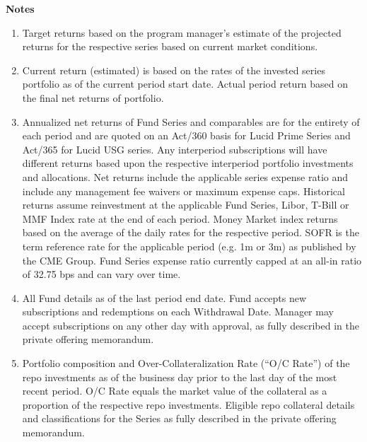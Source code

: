 \documentclass[9pt]{article}
\begin{document}
    \onecolumn



    \pagebreak

    \footnotesize
    \noindent\textbf{\color{lucid_blue}Notes}

    \begin{enumerate}
        \item Target returns based on the program manager's estimate of the projected returns for the respective series based on current market conditions.

        \item Current return (estimated) is based on the rates of the invested series portfolio as of the current period start date. Actual period return based on the final net returns of portfolio.

        \item Annualized net returns of Fund Series and comparables are for the entirety of each period and are quoted on an Act/360 basis for Lucid Prime Series and Act/365 for Lucid USG series. Any interperiod subscriptions will have different returns based upon the respective interperiod portfolio investments and allocations. Net returns include the applicable series expense ratio and include any management fee waivers or maximum expense caps. Historical returns assume reinvestment at the applicable Fund Series, Libor, T-Bill or MMF Index rate at the end of each period. Money Market index returns based on the average of the daily rates for the respective period. SOFR is the term reference rate for the applicable period (e.g. 1m or 3m) as published by the CME Group. Fund Series expense ratio currently capped at an all-in ratio of 32.75 bps and can vary over time.

        \item All Fund details as of the last period end date. Fund accepts new subscriptions and redemptions on each Withdrawal Date. Manager may accept subscriptions on any other day with approval, as fully described in the private offering memorandum.

        \item Portfolio composition and Over-Collateralization Rate (``O/C Rate'') of the repo investments as of the business day prior to the last day of the most recent period. O/C Rate equals the market value of the collateral as a proportion of the respective repo investments. Eligible repo collateral details and classifications for the Series as fully described in the private offering memorandum.

    \end{enumerate}
\end{document}
